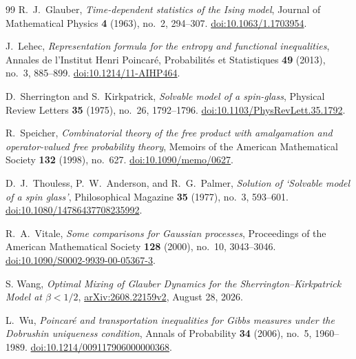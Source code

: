 \begin{thebibliography}{99}
R.~J.~Glauber, \emph{Time-dependent statistics of the Ising model},
Journal of Mathematical Physics \textbf{4} (1963), no.~2, 294--307.
\href{https://doi.org/10.1063/1.1703954}{doi:10.1063/1.1703954}.

J.~Lehec,
\emph{Representation formula for the entropy and functional inequalities},
Annales de l'Institut Henri Poincar\'e, Probabilit\'es et Statistiques
\textbf{49} (2013), no.~3, 885--899.
\href{https://doi.org/10.1214/11-AIHP464}{doi:10.1214/11-AIHP464}.

D.~Sherrington and S.~Kirkpatrick, \emph{Solvable model of a spin-glass},
Physical Review Letters \textbf{35} (1975), no.~26, 1792--1796.
\href{https://doi.org/10.1103/PhysRevLett.35.1792}{doi:10.1103/PhysRevLett.35.1792}.

R.~Speicher, \emph{Combinatorial theory of the free product with
amalgamation and operator-valued free probability theory},
Memoirs of the American Mathematical Society \textbf{132} (1998), no.~627.
\href{https://doi.org/10.1090/memo/0627}{doi:10.1090/memo/0627}.

D.~J.~Thouless, P.~W.~Anderson, and R.~G.~Palmer,
\emph{Solution of `Solvable model of a spin glass'},
Philosophical Magazine \textbf{35} (1977), no.~3, 593--601.
\href{https://doi.org/10.1080/14786437708235992}{doi:10.1080/14786437708235992}.

R.~A.~Vitale, \emph{Some comparisons for Gaussian processes},
Proceedings of the American Mathematical Society \textbf{128} (2000),
no.~10, 3043--3046.
\href{https://doi.org/10.1090/S0002-9939-00-05367-3}{doi:10.1090/S0002-9939-00-05367-3}.

S. Wang, \emph{Optimal Mixing of Glauber Dynamics for the
Sherrington--Kirkpatrick Model at $\beta<1/2$},
\href{https://arxiv.org/abs/2608.22159v2}{arXiv:2608.22159v2},
August 28, 2026.

L.~Wu, \emph{Poincar\'e and transportation inequalities for Gibbs measures
under the Dobrushin uniqueness condition}, Annals of Probability
\textbf{34} (2006), no.~5, 1960--1989.
\href{https://doi.org/10.1214/009117906000000368}{doi:10.1214/009117906000000368}.

\end{thebibliography}
